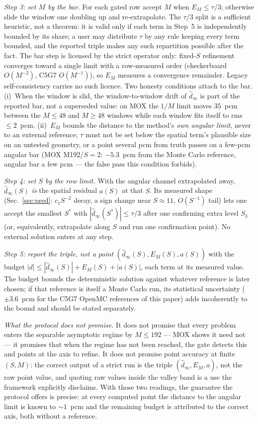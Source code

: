 \documentclass[11pt,a4paper]{article}
\begin{document}
\emph{Step 3: set $M$ by the bar.}  For each gated row accept $M$
when $E_M\le\tau/3$; otherwise slide the window one doubling up and
re-extrapolate.  The $\tau/3$ split is a sufficient heuristic, not a
theorem: it is valid only if each term in Step~5 is independently
bounded by its share; a user may distribute $\tau$ by any rule
keeping every term bounded, and the reported triple makes any such
repartition possible after the fact.  The bar step is licensed by
the strict operator only: fixed-$S$ refinement converges toward a
single limit with a row-measured order (checkerboard $O(M^{-2})$,
C5G7 $O(M^{-1})$), so $E_M$ measures a convergence remainder.
Legacy self-consistency carries no such licence.  Two honesty
conditions attach to the bar.  (i)~When the window is slid, the
window-to-window drift of $\hat d_\infty$ is part of the reported
bar, not a superseded value: on MOX the $1/M$ limit moves $35$~pcm
between the $M\le48$ and $M\ge48$ windows while each window fits
itself to rms $\le2$~pcm.  (ii)~$E_M$ bounds the distance to the
method's \emph{own angular limit}, never to an external reference;
$\tau$ must not be set below the spatial term's plausible size on
an untested geometry, or a point several pcm from truth passes on a
few-pcm angular bar (MOX M192/$S{=}2$: $-5.3$~pcm from the Monte
Carlo reference, angular bar a few pcm --- the false pass this
condition forbids).

\emph{Step 4: set $S$ by the row limit.}  With the angular channel
extrapolated away, $\hat d_\infty(S)$ \emph{is} the spatial residual
$a(S)$ at that $S$.  Its measured shape (Sec.~\ref{sec:pred}:
$c_1S^{-2}$ decay, a sign change near $S\approx11$, $O(S^{-1})$ tail)
lets one accept the smallest $S^*$ with $|\hat d_\infty(S^*)|\le
\tau/3$ after one confirming extra level $S_3$ (or, equivalently,
extrapolate along $S$ and run one confirmation point).  No external
solution enters at any step.

\emph{Step 5: report the triple, not a point} $(\hat d_\infty(S),
E_M(S), a(S))$ with the budget $|d|\le|\hat d_\infty(S)|+E_M(S)+
|a(S)|$, each term at its measured value.  The budget bounds the
deterministic solution against whatever reference is later chosen;
if that reference is itself a Monte Carlo run, its statistical
uncertainty ($\pm3.6$~pcm for the C5G7 OpenMC references of this
paper) adds incoherently to the bound and should be stated
separately.

\emph{What the protocol does not promise.}  It does not promise that
every problem enters the separable asymptotic regime by $M\le192$
--- MOX shows it need not --- it promises that when the regime has
not been reached, the gate detects this and points at the axis to
refine.  It does not promise point accuracy at finite $(S,M)$: the
correct output of a strict run is the triple $(\hat d_\infty,
E_M,a)$, not the raw point value, and quoting raw values inside the
valley band is a use the framework explicitly disclaims.  With those
two readings, the guarantee the protocol offers is precise: at every
computed point the distance to the angular limit is known to
$\sim1$~pcm and the remaining budget is attributed to the correct
axis, both without a reference.
\end{document}
